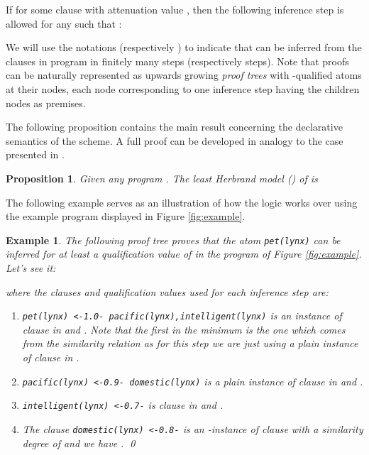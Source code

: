 \documentclass{sigplanconf}
\theoremstyle{definition}
\theoremstyle{plain}
\newtheorem{proposition}{Proposition}
\newtheorem{example}{Example}
\begin{document}
If  for some clause  with attenuation value , then the following inference step is allowed for any  such that :


We will use the notations  (respectively ) to indicate that  can be inferred from the clauses in program  in finitely many steps (respectively  steps). Note that  proofs can be naturally represented as upwards growing \emph{proof trees} with -qualified atoms at their nodes, each node corresponding to one inference step having the children nodes as premises.

The following proposition contains the main result concerning the declarative semantics of the  scheme. A full proof can be developed in analogy to the  case presented in \cite{RR08,RR08TR}.

\begin{proposition}\label{prop:least-model}
Given any  program . The \emph{least Herbrand model} () of  is 
\end{proposition}

The following example serves as an illustration of how the logic  works over  using the example program displayed in Figure  \ref{fig:example}.

\begin{example}\label{ex:least-model}
The following proof tree proves that the atom \emph{\texttt{pet(ly\-nx)}} can be inferred for at least a qualification value of  in the  program  of Figure \ref{fig:example}. Let's see it:



\noindent where the clauses and qualification values used for each inference step are:

\begin{enumerate}
    \item[(1)] \emph{\texttt{pet(lynx) <-1.0- pacific(lynx),intelligent(lynx)}} is an instance of clause  in  and   . Note that the first  in the minimum is the one which comes from the similarity relation as for this step we are just using a plain instance of clause  in .
    \item[(2)] \emph{\texttt{pacific(lynx) <-0.9- domestic(lynx)}} is a plain instance of clause  in  and .
    \item[(3)] \emph{\texttt{intelligent(lynx) <-0.7-}} is clause  in  and .
    \item[(4)] The clause \emph{\texttt{domestic(lynx) <-0.8-}} is an -instance of clause  with a similarity degree of  and we have . \qed
\end{enumerate}
\end{example}
\end{document}
